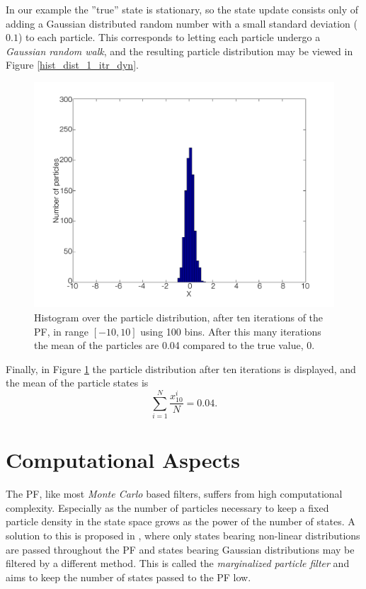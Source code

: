 \documentclass{LTHthesis}
\begin{document}
In our example the ''true'' state is stationary, so the state update consists only of adding a Gaussian distributed random number with a small standard deviation ($0.1$) to each particle. This corresponds to letting each particle undergo a \emph{Gaussian random walk}, and the resulting particle distribution may be viewed in Figure \ref{hist_dist_1_itr_dyn}.
%
\begin{figure}[!hbt]

\includegraphics[width=1\textwidth ]{images/PF/hist_dist_10_itr}
\caption{Histogram over the particle distribution, after ten iterations of the PF, in range $[-10,10]$ using 100 bins. After this many iterations the mean of the particles are 0.04 compared to the true value, 0.}\label{hist_dist_10_itr}
\end{figure}

Finally, in Figure \ref{hist_dist_10_itr} the particle distribution after ten iterations is displayed, and the mean of the particle states is
\begin{equation}
\sum^{N}_{i=1}{\frac{x^i_{10}}{N}} = 0.04.
\end{equation} 
%
\section{Computational Aspects}
\label{sec:com_asp}
%
The PF, like most \emph{Monte Carlo} based filters, suffers from high computational complexity. Especially as the number of particles necessary to keep a fixed particle density in the state space grows as the power of the number of states. A solution to this is proposed in \cite{gson12}, where only states bearing non-linear distributions are passed throughout the PF and states bearing Gaussian distributions may be filtered by a different method. This is called the \emph{marginalized particle filter} and aims to keep the number of states passed to the PF low. 
\end{document}
